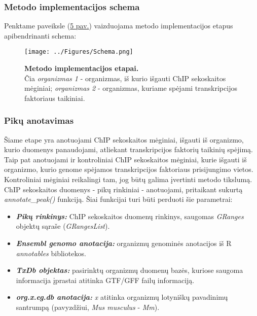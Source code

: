 \documentclass[12pt]{article}
\begin{document}
\subsubsection{Metodo implementacijos schema}
Penktame paveiksle (\hyperref[fig:image5]{5 pav.}) vaizduojama metodo
implementacijos etapus apibendrinanti schema:

\begin{figure}[ht]
    \begin{center}
        \captionsetup{justification=centering}
        \texttt{[image: ../Figures/Schema.png]}
        \vspace{-1\baselineskip}
        \caption{\small\textbf{Metodo implementacijos etapai.}\\Čia
        \emph{organizmas 1} - organizmas, iš kurio išgauti ChIP sekoskaitos
        mėginiai; \emph{organizmas 2} - organizmas, kuriame spėjami
        transkripcijos faktoriaus taikiniai.}
    \label{fig:image5}
    \end{center}
\end{figure}

\newpage

\subsubsection{Pikų anotavimas}
Šiame etape yra anotuojami ChIP sekoskaitos mėginiai, išgauti iš organizmo,
kurio duomenys panaudojami, atliekant transkripcijos faktorių taikinių spėjimą.
Taip pat anotuojami ir kontroliniai ChIP sekoskaitos mėginiai, kurie išgauti iš
organizmo, kurio genome spėjamos transkripcijos faktoriaus prisijungimo vietos.
Kontroliniai mėginiai reikalingi tam, jog būtų galima įvertinti metodo tikslumą.
ChIP sekoskaitos duomenys - pikų rinkiniai - anotuojami, pritaikant sukurtą
\emph{annotate\_peak()} funkciją. Šiai funkcijai turi būti perduoti šie
parametrai:

\begin{itemize}
    \item \textbf{\emph{Pikų rinkinys:}} ChIP sekoskaitos duomenų rinkinys,
        saugomas \emph{GRanges} objektų sąraše (\emph{GRangesList}).
    \item \textbf{\emph{Ensembl genomo anotacija:}} organizmų genominės
        anotacijos iš R \emph{annotables} bibliotekos.
    \item \textbf{\emph{TxDb objektas:}} pasirinktų organizmų duomenų bazės,
        kuriose saugoma informacija įprastai atitinka GTF/GFF failų informaciją.
    \item \textbf{\emph{org.x.eg.db anotacija:}} \emph{x} atitinka organizmų
        lotyniškų pavadinimų santrumpą (pavyzdžiui, \emph{Mus musculus} -
        \emph{Mm}).
\end{itemize}
\end{document}
